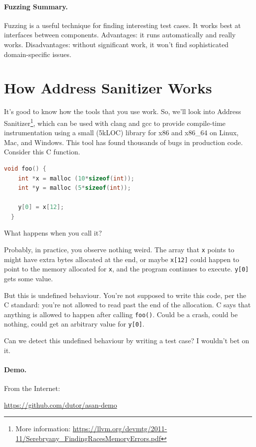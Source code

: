 \documentclass[11pt]{article}
\begin{document}
\paragraph{Fuzzing Summary.} Fuzzing is a useful technique for finding
interesting test cases. It works best at interfaces between components.
Advantages: it runs automatically and really works. Disadvantages: without
significant work, it won't find sophisticated domain-specific issues.

\section*{How Address Sanitizer Works}
It's good to know how the tools that you use work. So, we'll look into
Address Sanitizer\footnote{More information: \url{https://llvm.org/devmtg/2011-11/Serebryany_FindingRacesMemoryErrors.pdf}}, which can be used with clang and gcc to provide
compile-time instrumentation using a small (5kLOC) library for
x86 and x86\_64 on Linux, Mac, and Windows. This tool has found
thousands of bugs in production code. Consider this
C function. 

\begin{lstlisting}[language=C]
  void foo() {
    int *x = malloc (10*sizeof(int));
    int *y = malloc (5*sizeof(int));

    y[0] = x[12];
  }
\end{lstlisting}
What happens when you call it?

Probably, in practice, you observe nothing weird. The array that \texttt{x}
points to might have extra bytes allocated at the end, or maybe
\texttt{x[12]} could happen to point to the memory allocated for
\texttt{x}, and the program continues to execute. \texttt{y[0]} gets
some value.

But this is undefined behaviour. You're not supposed to write this code,
per the C standard: you're not allowed to read past the end of the allocation.
C says that anything is allowed to happen after calling \texttt{foo()}.
Could be a crash, could be nothing, could get an arbitrary value for
\texttt{y[0]}.

Can we detect this undefined behaviour by writing a test case? I
wouldn't bet on it.

\paragraph{Demo.} From the Internet:
\begin{center}
  \url{https://github.com/dutor/asan-demo}
\end{center}
\end{document}
